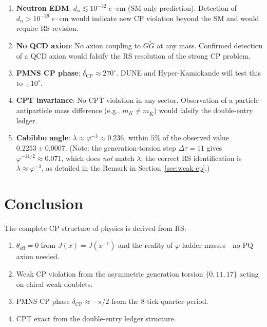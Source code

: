 \documentclass[12pt,a4paper]{article}
\theoremstyle{definition}
\theoremstyle{remark}
\begin{document}
\begin{enumerate}
  \item \textbf{Neutron EDM}: $d_n \lesssim
  10^{-32}\;e\cdot\mathrm{cm}$ (SM-only prediction).
  Detection of $d_n > 10^{-29}\;e\cdot\mathrm{cm}$ would
  indicate new CP violation beyond the SM and would require
  RS revision.

  \item \textbf{No QCD axion}: No axion coupling to
  $G\tilde{G}$ at any mass.  Confirmed detection of a QCD
  axion would falsify the RS resolution of the strong CP
  problem.

  \item \textbf{PMNS CP phase}:
  $\delta_{\mathrm{CP}} \approx 270^\circ$.
  DUNE and Hyper-Kamiokande will test this to $\pm 10^\circ$.

  \item \textbf{CPT invariance}: No CPT violation in any
  sector.  Observation of a particle--antiparticle mass
  difference (e.g., $m_K \neq m_{\bar{K}}$) would falsify the
  double-entry ledger.

  \item \textbf{Cabibbo angle}:
  $\lambda \approx \varphi^{-3} \approx 0.236$, within $5\%$ of the
  observed value $0.2253 \pm 0.0007$.  (Note: the generation-torsion
  step $\Delta\tau = 11$ gives $\varphi^{-11/2} \approx 0.071$, which
  does \emph{not} match $\lambda$; the correct RS identification is
  $\lambda \approx \varphi^{-3}$, as detailed in the Remark in
  Section~\ref{sec:weak-cp}.)
\end{enumerate}

\section{Conclusion}
\label{sec:conclusion}

The complete CP structure of physics is derived from RS:
\begin{enumerate}
  \item $\theta_{\mathrm{eff}} = 0$ from $J(x) = J(x^{-1})$
  and the reality of $\varphi$-ladder masses---no PQ axion
  needed.
  \item Weak CP violation from the asymmetric generation
  torsion $\{0, 11, 17\}$ acting on chiral weak doublets.
  \item PMNS CP phase $\delta_{\mathrm{CP}} \approx -\pi/2$
  from the 8-tick quarter-period.
  \item CPT exact from the double-entry ledger structure.
\end{enumerate}
\end{document}
